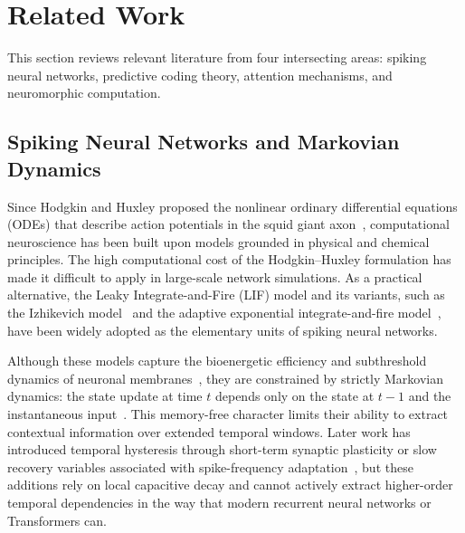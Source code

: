 \section{Related Work}\label{sec:related}

This section reviews relevant literature from four intersecting areas: spiking neural networks, predictive coding theory, attention mechanisms, and neuromorphic computation.

\subsection{Spiking Neural Networks and Markovian Dynamics}

Since Hodgkin and Huxley proposed the nonlinear ordinary differential equations (ODEs) that describe action potentials in the squid giant axon~\cite{hodgkin1952}, computational neuroscience has been built upon models grounded in physical and chemical principles. The high computational cost of the Hodgkin--Huxley formulation has made it difficult to apply in large-scale network simulations. As a practical alternative, the Leaky Integrate-and-Fire (LIF) model and its variants, such as the Izhikevich model~\cite{izhikevich2003} and the adaptive exponential integrate-and-fire model~\cite{brette2005}, have been widely adopted as the elementary units of spiking neural networks.

Although these models capture the bioenergetic efficiency and subthreshold dynamics of neuronal membranes~\cite{gerstner2014}, they are constrained by strictly Markovian dynamics: the state update at time $t$ depends only on the state at $t-1$ and the instantaneous input~\cite{abbott1999}. This memory-free character limits their ability to extract contextual information over extended temporal windows. Later work has introduced temporal hysteresis through short-term synaptic plasticity or slow recovery variables associated with spike-frequency adaptation~\cite{benda2003}, but these additions rely on local capacitive decay and cannot actively extract higher-order temporal dependencies in the way that modern recurrent neural networks or Transformers can.

